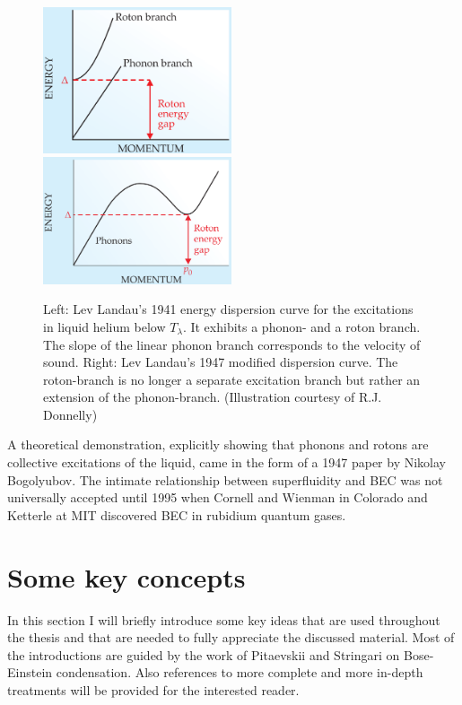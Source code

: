 		\begin{figure}[t]
			\begin{center}
				\includegraphics[width=0.495\textwidth]{phonon-roton-landau-first}
				\includegraphics[width=0.495\textwidth]{phonon-roton-bogoliubov}
			\end{center}
			\caption{Left: Lev Landau's 1941 energy dispersion curve\citep{Landau1941} for the excitations in liquid helium below $T_\lambda$. It exhibits a phonon- and a roton branch. The slope of the linear phonon branch corresponds to the velocity of sound. Right: Lev Landau's 1947 modified dispersion curve. The roton-branch is no longer a separate excitation branch but rather an extension of the phonon-branch. (Illustration courtesy of R.J. Donnelly\citep{Donnelly2009})}
			\label{fig:phonon-roton}
		\end{figure}

		A theoretical demonstration, explicitly showing that phonons and rotons are collective excitations of the liquid, came in the form of a 1947 paper by Nikolay Bogolyubov\citep{Bogolyubov1947}. The intimate relationship between superfluidity and BEC was not universally accepted until 1995 when Cornell and Wienman in Colorado and Ketterle at MIT discovered BEC in rubidium quantum gases\citep{Cornell2002,Ketterle2002}.

	\section{Some key concepts}
		In this section I will briefly introduce some key ideas that are used throughout the thesis and that are needed to fully appreciate the discussed material. Most of the introductions are guided by the work of Pitaevskii and Stringari on Bose-Einstein condensation\citep{Pita2016}. Also references to more complete and more in-depth treatments will be provided for the interested reader.
		
